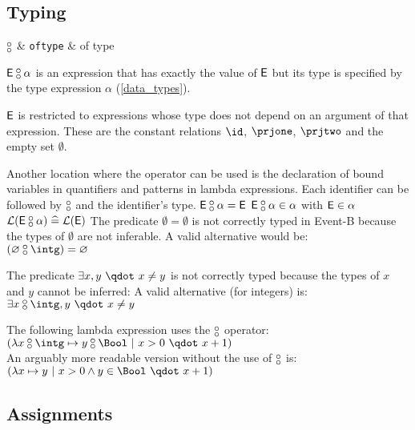 \begin{samepage}
\subsection{Typing}
\label{typing}
\begin{rrnames}
  $\boftype$      & \texttt{oftype}   & of type
\end{rrnames}
\begin{rodinrefentry}
  \rrdesc
    $\expre\boftype \alpha$ is an expression that has exactly the value of $\textsf{E}$ but its
    type is specified by the type expression $\alpha$ (\ref{data_types}).

    $\mathsf{\textsf{E}}$ is restricted to expressions whose type does not depend on an argument of that expression.
    These are the constant relations $\id$, $\prjone$, $\prjtwo$ and the empty set $\emptyset$.

    Another location where the operator can be used is the declaration of bound variables 
    in quantifiers and patterns in lambda expressions.
    Each identifier can be followed by $\boftype$ and the identifier's type.
  \rrdef
    $\expre\boftype\alpha = \expre$
  \rrtypes
    $\expre\boftype\alpha\in\alpha$ with $\textsf{E}\in\alpha$
  \rrwd
    $\wdl(\expre\boftype\alpha) \defi \wdl(\expre)$
  \rrex
    The predicate $\emptyset=\emptyset$ is not correctly typed in Event-B because the types
    of $\emptyset$ are not inferable. A valid alternative would be:\\
    $(\emptyset\boftype\intg) = \emptyset$

    The predicate $\exists x,y ~\qdot~ x\neq y$ is not correctly typed because the types of $x$ and $y$
    cannot be inferred: A valid alternative (for integers) is:\\
    $\exists x\boftype\intg,y ~\qdot~ x\neq y$

    The following lambda expression uses the $\boftype$ operator:\\
    $(\lambda x\boftype \intg\mapsto y\boftype\Bool ~|~ x>0 ~\qdot~ x+1)$\\
    An arguably more readable version without the use of $\boftype$ is:\\
    $(\lambda x\mapsto y ~|~ x>0 \land y\in\Bool ~\qdot~ x+1)$
\end{rodinrefentry}
\end{samepage}


\subsection{Assignments}
\label{assignments}

